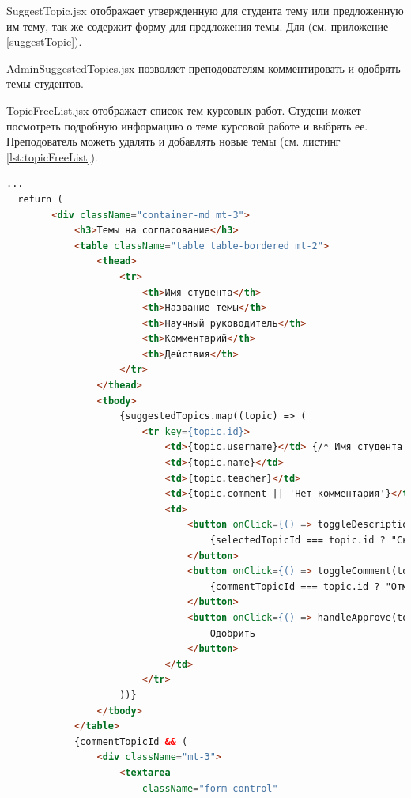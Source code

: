 \documentclass[14pt]{extarticle} %
\begin{document}
SuggestTopic.jsx отображает утвержденную для студента тему или предложенную им тему, так же содержит форму для предложения темы. Для  (см. приложение \ref{suggestTopic}).

AdminSuggestedTopics.jsx позволяет преподователям комментировать и одобрять темы студентов.

TopicFreeList.jsx отображает список тем курсовых работ. Студени может посмотреть подробную информацию о теме курсовой работе и выбрать ее. Преподователь можеть удалять и добавлять новые темы (см. листинг \ref{lst:topicFreeList}). 

\begin{lstlisting}[language=html, caption={TopicFreeList.jsx}, label={lst:topicFreeList}]
  ...
  return (
        <div className="container-md mt-3">
            <h3>Темы на согласование</h3>
            <table className="table table-bordered mt-2">
                <thead>
                    <tr>
                        <th>Имя студента</th>
                        <th>Название темы</th>
                        <th>Научный руководитель</th>
                        <th>Комментарий</th>
                        <th>Действия</th>
                    </tr>
                </thead>
                <tbody>
                    {suggestedTopics.map((topic) => (
                        <tr key={topic.id}>
                            <td>{topic.username}</td> {/* Имя студента */}
                            <td>{topic.name}</td>
                            <td>{topic.teacher}</td>
                            <td>{topic.comment || 'Нет комментария'}</td>
                            <td>
                                <button onClick={() => toggleDescription(topic.id)} className="btn btn-info">
                                    {selectedTopicId === topic.id ? "Скрыть описание" : "Подробнее"}
                                </button>
                                <button onClick={() => toggleComment(topic.id)} className="btn btn-warning ms-2">
                                    {commentTopicId === topic.id ? "Отмена" : "Комментировать"}
                                </button>
                                <button onClick={() => handleApprove(topic.id)} className="btn btn-success ms-2">
                                    Одобрить
                                </button>
                            </td>
                        </tr>
                    ))}
                </tbody>
            </table>
            {commentTopicId && (
                <div className="mt-3">
                    <textarea
                        className="form-control"

\end{lstlisting}
\end{document}
